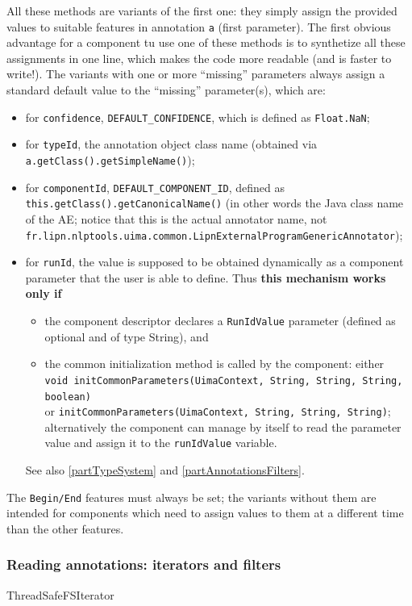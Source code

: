 \documentclass{article}
\newenvironment{xitemize}{
\begin{itemize}
  \setlength{\itemsep}{.3\baselineskip}
  \setlength{\topsep}{0pt}
  \setlength{\parskip}{0pt}
  \setlength{\parsep}{0pt}
}{\end{itemize}}
\newcommand{\packname}{fr.lipn.nlptools}
\newcommand{\uimaPackname}{\packname.uima}
\begin{document}
All these methods are variants of the first one: they simply assign the provided values to suitable features in annotation {\tt a} (first parameter). The first obvious advantage for a component tu use one of these methods is to synthetize all these assignments in one line, which makes the code more readable (and is faster to write!). The variants with one or more ``missing'' parameters always assign a standard default value to the ``missing'' parameter(s), which are:
\begin{xitemize}
\item for {\tt confidence}, {\tt DEFAULT\_CONFIDENCE}, which is defined as {\tt Float.NaN};
\item for {\tt typeId}, the annotation object class name (obtained via {\tt a.getClass().getSimpleName()});
\item for {\tt componentId}, {\tt DEFAULT\_COMPONENT\_ID}, defined as {\tt this.getClass().getCanonicalName()} (in other words the Java class name of the AE; notice that this is the actual annotator name, not\\
{\tt \uimaPackname.common.LipnExternalProgramGenericAnnotator});
\item for {\tt runId}, the value is supposed to be obtained dynamically as a component parameter that the user is able to define. Thus {\bf this mechanism works only if}
\begin{xitemize}
\item  the component descriptor declares a {\tt RunIdValue} parameter (defined as optional and of type String), and
\item the common initialization method is called by the component: either\\
 {\tt void initCommonParameters(UimaContext, String, String, String, boolean)}\\ or {\tt initCommonParameters(UimaContext, String, String, String)};\\ alternatively the component can manage by itself to read the parameter value and assign it to the {\tt runIdValue} variable.
\end{xitemize}
  See also \ref{partTypeSystem} and \ref{partAnnotationsFilters}.
\end{xitemize}

The {\tt Begin/End} features must always be set; the variants without them are intended for components which need to assign values to them at a different time than the other features.




\subsubsection{Reading annotations: iterators and filters}
\label{partIterators}
ThreadSafeFSIterator
\end{document}
